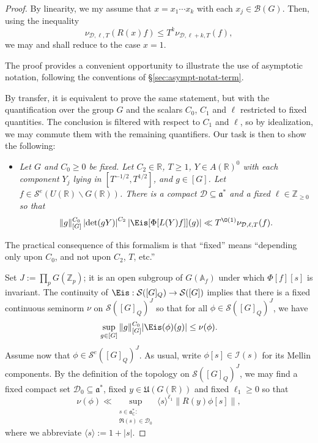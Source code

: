 \begin{proof}
  By linearity, we my assume that $x = x_1 \dotsb x_k$ with each $x_j \in \mathcal{B}(G)$.  Then, using the inequality
  \begin{equation*}
    \nu_{\mathcal{D},\ell,T}(R(x) f) \leq
    T^k
    \nu_{\mathcal{D},\ell + k, T}(f),
  \end{equation*}
  we may and shall reduce to the case $x = 1$.

  The proof provides a convenient opportunity to illustrate the use of asymptotic notation, following the conventions of \S\ref{sec:asympt-notat-term}.

  By transfer, it is equivalent to prove the same statement, but with the quantification over the group $G$ and the scalars $C_0$, $C_1$ and $\ell$ restricted to fixed quantities.  The conclusion is filtered with respect to $C_1$ and $\ell$, so by idealization, we may commute them with the remaining quantifiers.  Our task is then to show the following:
  \begin{itemize}
  \item \emph{Let $G$ and $C_0 \geq 0$ be fixed.  Let $C_2 \in \mathbb{R}$, $T \geq 1$, $Y \in A(\mathbb{R})^0$ with each component $Y_j$ lying in $[T^{-1/2}, T^{1/2}]$, and $g \in [G]$.  Let $f \in \mathcal{S}^e(U(\mathbb{R}) \backslash G(\mathbb{R}))$.  There is a compact $\mathcal{D} \subseteq \mathfrak{a}^*$ and a fixed $\ell \in \mathbb{Z}_{\geq 0}$ so that}
    \begin{equation}\label{eq:g_gc_0-leftlv-detg}
      \|g\|_{[G]}^{C_0}
      \left\lvert     \det(g Y) \right\rvert^{C_2}
      \left\lvert \Eis[\Phi[ L(Y) f]](g) \right\rvert
      \ll T^{\O(1)} \nu_{\mathcal{D},\ell,T}(f).
    \end{equation}
  \end{itemize}
  The practical consequence of this formalism is that ``fixed'' means ``depending only upon $C_0$, and not upon $C_2$, $T$, etc.''

  Set $J := \prod_p G(\mathbb{Z}_p)$; it is an open subgroup of $G(\mathbb{A}_f)$ under which $\Phi[f][s]$ is invariant.  The continuity of $\Eis : \mathcal{S}([G]_Q) \rightarrow \mathcal{S}([G])$ implies that there is a fixed continuous seminorm $\nu$ on $\mathcal{S}([G]_Q)^J$ so that for all $\phi \in \mathcal{S}([G]_Q)^J$, we have
  \begin{equation}\label{eq:sup-_g-in}
    \sup_{g \in [G]} \|g\| ^{C_0} _{[G]} | \Eis(\phi) (g)| \leq \nu(\phi).
  \end{equation}
  Assume now that $\phi \in \mathcal{S}^e([G]_Q)^J$.  As usual, write $\phi[s] \in \mathcal{I}(s)$ for its Mellin components.  By the definition of the topology on $\mathcal{S}([G]_Q)^J$, we may find a fixed compact set $\mathcal{D}_0 \subseteq \mathfrak{a}^*$, fixed $y \in \mathfrak{U}(G(\mathbb{R}))$ and fixed $\ell_1 \geq 0$ so that
  \begin{equation}\label{eq:nuphi-ll-sup}
    \nu(\phi) \ll \sup_{
      \substack{
        s \in \mathfrak{a}_{\mathbb{C}}^* :
        \\
        \Re(s) \in \mathcal{D}_0
      }
    }
    \langle s \rangle^{\ell_1} \|R(y) \phi[s]\|,
  \end{equation}
  where we abbreviate $\langle s \rangle := 1 + |s|$.


\end{proof}
